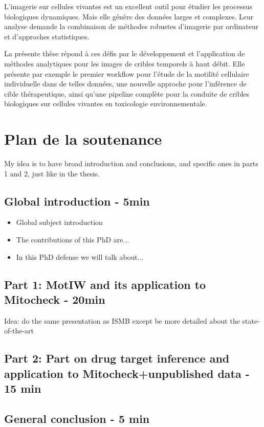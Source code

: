 \documentclass[12pt]{article}
\begin{document}
L'imagerie sur cellules vivantes est un excellent outil pour étudier les processus biologiques dynamiques. Mais elle génère des données larges et complexes. Leur analyse demande la combinaison de méthodes robustes d'imagerie par ordinateur et d'approches statistiques.

La présente thèse répond à ces défis par le développement et l'application de méthodes analytiques pour les images de cribles temporels à haut débit. Elle présente par exemple le premier workflow pour l'étude de la motilité cellulaire individuelle dans de telles données, une nouvelle approche pour l'inférence de cible thérapeutique, ainsi qu'une pipeline complète pour la conduite de cribles biologiques sur cellules vivantes en toxicologie environnementale. %

\section{Plan de la soutenance}
My idea is to have broad introduction and conclusions, and specific ones in parts 1 and 2, just like in the thesis.
\subsection*{Global introduction - 5min}
\begin{itemize}
\item Global subject introduction
\item The contributions of this PhD are... 
\item In this PhD defense we will talk about...
\end{itemize}
\subsection*{Part 1: MotIW and its application to Mitocheck - 20min}
Idea: do the same presentation as ISMB except be more detailed about the state-of-the-art
\subsection*{Part 2: Part on drug target inference and application to Mitocheck+unpublished data - 15 min}
\subsection*{General conclusion - 5 min}

%
%
\end{document}
